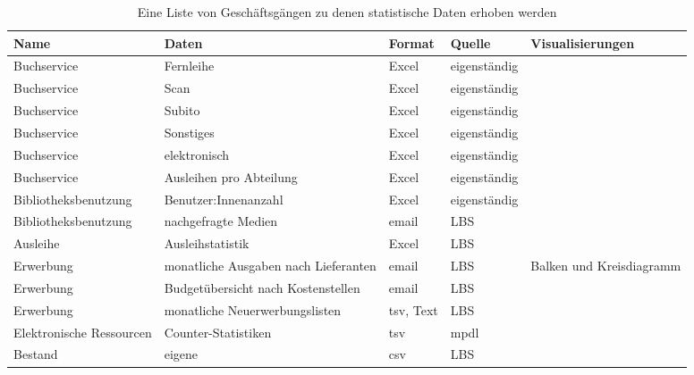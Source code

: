 \begingroup
\setlength{\tabcolsep}{12pt} %
\renewcommand{\arraystretch}{1.5} 
\begin{table}[h]
    \centering
    \begin{adjustbox}{max width=\textwidth}
    \begin{tabular}{lllll}
       \toprule
       \textbf{Name}& \textbf{Daten} & \textbf{Format} & \textbf{Quelle} & \textbf{Visualisierungen}\\
       \midrule     
            Buchservice              & Fernleihe                            & Excel         & eigenständig & \- \\ 
            Buchservice              & Scan                                 & Excel         & eigenständig & \-\\ 
            Buchservice              & Subito                               & Excel         & eigenständig & \-\\ 
            Buchservice              & Sonstiges                            & Excel         & eigenständig & \-\\ 
            Buchservice              & elektronisch                         & Excel         & eigenständig & \-\\ 
            Buchservice              & Ausleihen pro Abteilung              & Excel         & eigenständig & \-\\ 
            Bibliotheksbenutzung     & Benutzer:Innenanzahl                 & Excel         & eigenständig & \-\\ 
            Bibliotheksbenutzung     & nachgefragte Medien                  & email         & LBS          & \-\\ 
            Ausleihe                 & Ausleihstatistik                     & Excel         & LBS          & \-\\ 
            Erwerbung                & monatliche Ausgaben nach Lieferanten & email         & LBS          & Balken und Kreisdiagramm\\ 
            Erwerbung                & Budgetübersicht nach Kostenstellen   & email         & LBS          & \-\\ 
            Erwerbung                & monatliche Neuerwerbungslisten       & tsv, Text     & LBS          & \-\\ 
            Elektronische Ressourcen & Counter-Statistiken                  & tsv           & mpdl         & \-\\ 
            Bestand                  & eigene                               & csv           & LBS          & \-\\
        \bottomrule
    \end{tabular}
    \end{adjustbox}
    \caption{%
        Eine Liste von Geschäftsgängen zu denen statistische Daten erhoben werden
    }
    \label{tab:Statistische_Daten}
     \end{table}
\endgroup

